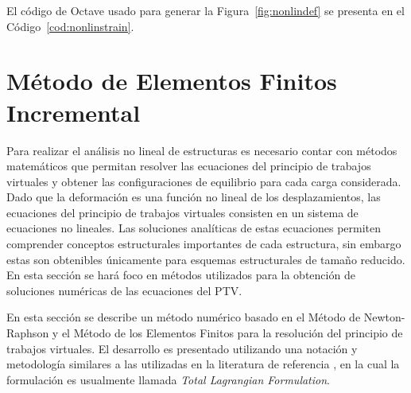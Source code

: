 
El código de Octave usado para generar la Figura~\ref{fig:nonlindef} se presenta en el Código~\ref{cod:nonlinstrain}.

















\section{Método de Elementos Finitos Incremental}\label{FEM}

Para realizar el análisis no lineal de estructuras es necesario contar con métodos matemáticos que permitan resolver las ecuaciones del principio de trabajos virtuales y obtener las configuraciones de equilibrio para cada carga considerada. %
%
Dado que la deformación es una función no lineal de los desplazamientos, las ecuaciones del principio de trabajos virtuales consisten en un sistema de ecuaciones no lineales. %
%
Las soluciones analíticas de estas ecuaciones permiten comprender conceptos estructurales importantes de cada estructura, sin embargo estas son obtenibles únicamente para esquemas estructurales de tamaño reducido. %
%
En esta sección se hará foco en métodos utilizados para la obtención de soluciones numéricas de las ecuaciones del PTV. %


En esta sección se describe un método numérico basado en el Método de Newton-Raphson y el Método de los Elementos Finitos para la resolución del principio de trabajos virtuales. %
%
El desarrollo es presentado utilizando una notación y metodología similares a las utilizadas en la literatura de referencia \citep{crisfield1996non,DeSouzaNeto2008,DeBorst2012}, en la cual la formulación es usualmente llamada \textit{Total Lagrangian Formulation}. %


